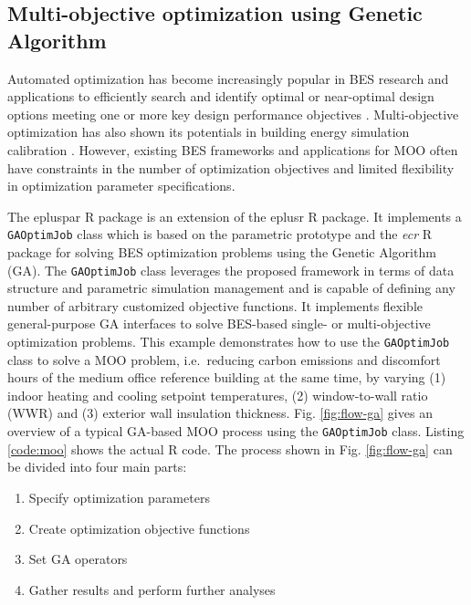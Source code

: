 \documentclass[3p, times]{elsarticle} %
\providecommand{\tightlist}{%
  \setlength{\itemsep}{0pt}\setlength{\parskip}{0pt}}
\begin{document}
\hypertarget{multi-objective-optimization-using-genetic-algorithm}{%
\subsection{Multi-objective optimization using Genetic Algorithm}\label{multi-objective-optimization-using-genetic-algorithm}}

Automated optimization has become increasingly popular in BES research and
applications to efficiently search and identify optimal or near-optimal design
options meeting one or more key design performance objectives \citep{Attia2013a}.
Multi-objective optimization has also shown its potentials in building energy
simulation calibration \citep{Yang2015c}.
However, existing BES frameworks and applications for MOO often have
constraints in the number of optimization objectives and limited flexibility in
optimization parameter specifications.

The epluspar R package is an extension of the eplusr R package.
It implements a \texttt{GAOptimJob} class which is based on the parametric prototype
and the \emph{ecr} R package \citep{Bossek2017} for solving BES optimization problems
using the Genetic Algorithm (GA).
The \texttt{GAOptimJob} class leverages the proposed framework in terms of data
structure and parametric simulation management and is capable of defining any
number of arbitrary customized objective functions.
It implements flexible general-purpose GA interfaces to solve BES-based single-
or multi-objective optimization problems.
This example demonstrates how to use the \texttt{GAOptimJob} class to solve a MOO
problem, i.e.~reducing carbon emissions and discomfort hours of the medium
office reference building at the same time, by varying (1) indoor heating and
cooling setpoint temperatures, (2) window-to-wall ratio (WWR) and (3) exterior
wall insulation thickness.
Fig. \ref{fig:flow-ga} gives an overview of a typical GA-based MOO process
using the \texttt{GAOptimJob} class.
Listing \ref{code:moo} shows the actual R code.
The process shown in Fig. \ref{fig:flow-ga} can be divided into four main
parts:

\begin{enumerate}
\def\labelenumi{\arabic{enumi}.}
\tightlist
\item
  Specify optimization parameters
\item
  Create optimization objective functions
\item
  Set GA operators
\item
  Gather results and perform further analyses
\end{enumerate}
\end{document}
